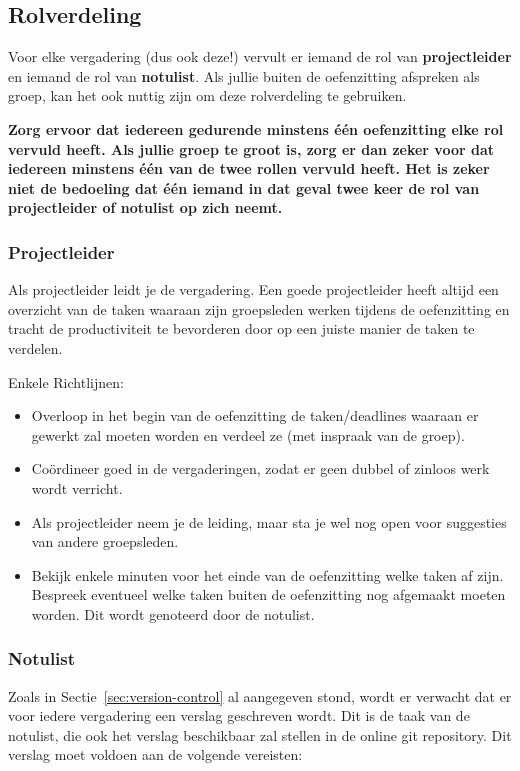 \documentclass[a4paper]{article}
\begin{document}
\subsection{Rolverdeling}

Voor elke vergadering (dus ook deze!) vervult er iemand de rol van \textbf{projectleider} en iemand de rol van \textbf{notulist}.
Als jullie buiten de oefenzitting afspreken als groep, kan het ook nuttig zijn om deze rolverdeling te gebruiken.

\textbf{
	Zorg ervoor dat iedereen gedurende minstens \'e\'en oefenzitting elke rol vervuld heeft.
	Als jullie groep te groot is, zorg er dan zeker voor dat iedereen minstens \'e\'en van de twee rollen vervuld heeft.
	Het is
	zeker niet de bedoeling dat \'e\'en iemand in dat geval twee keer de rol van projectleider of notulist op zich neemt.
}


\subsubsection{Projectleider}

Als projectleider leidt je de vergadering.
Een goede projectleider heeft altijd een overzicht van de taken waaraan zijn groepsleden werken tijdens de oefenzitting en tracht de productiviteit te bevorderen door op een juiste manier de taken te verdelen.

Enkele Richtlijnen:
\begin{itemize}
	\item Overloop in het begin van de oefenzitting de taken/deadlines waaraan er gewerkt zal moeten worden en verdeel ze (met inspraak van de groep).
	\item Co\"ordineer goed in de vergaderingen, zodat er geen dubbel of zinloos werk wordt verricht.
	\item Als projectleider neem je de leiding, maar sta je wel nog open voor suggesties van andere groepsleden.
	\item Bekijk enkele minuten voor het einde van de oefenzitting welke taken af zijn. Bespreek eventueel welke taken buiten de oefenzitting nog afgemaakt moeten worden. Dit wordt genoteerd door de notulist.
\end{itemize}


\subsubsection{Notulist}

Zoals in Sectie~\ref{sec:version-control} al aangegeven stond, wordt er verwacht dat er voor iedere vergadering een verslag geschreven wordt.
Dit is de taak van de notulist, die ook het verslag beschikbaar zal stellen in de online git repository.
Dit verslag moet voldoen aan de volgende vereisten:
\end{document}
